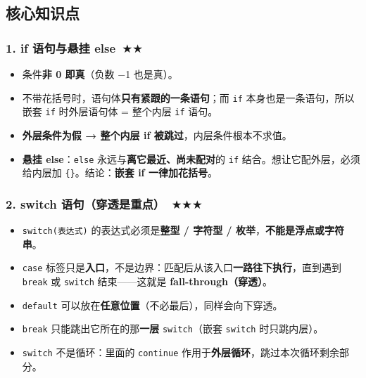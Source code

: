 \documentclass[UTF8,zihao=-4,a4paper]{ctexart}
\newcommand{\cstar}{\textcolor{deepred}{$\bigstar$}}
\begin{document}
\subsection{核心知识点}

\subsubsection*{1. if 语句与悬挂 else\ \cstar\cstar}
\begin{itemize}
  \item 条件\textbf{非 0 即真}（负数 −1 也是真）。
  \item 不带花括号时，语句体\textbf{只有紧跟的一条语句}；而 \texttt{if} 本身也是一条语句，所以嵌套 \texttt{if} 时外层语句体 = 整个内层 \texttt{if} 语句。
  \item \textbf{外层条件为假 → 整个内层 if 被跳过}，内层条件根本不求值。
  \item \textbf{悬挂 else}：\texttt{else} 永远与\textbf{离它最近、尚未配对}的 \texttt{if} 结合。想让它配外层，必须给内层加 \texttt{\{\}}。结论：\textbf{嵌套 if 一律加花括号}。
\end{itemize}

\subsubsection*{2. switch 语句（穿透是重点）\ \cstar\cstar\cstar}
\begin{itemize}
  \item \texttt{switch(表达式)} 的表达式必须是\textbf{整型 / 字符型 / 枚举}，\textbf{不能是浮点或字符串}。
  \item \texttt{case} 标签只是\textbf{入口}，不是边界：匹配后从该入口\textbf{一路往下执行}，直到遇到 \texttt{break} 或 \texttt{switch} 结束——这就是 \textbf{fall-through（穿透）}。
  \item \texttt{default} 可以放在\textbf{任意位置}（不必最后），同样会向下穿透。
  \item \texttt{break} 只能跳出它所在的那\textbf{一层} \texttt{switch}（嵌套 \texttt{switch} 时只跳内层）。
  \item \texttt{switch} 不是循环：里面的 \texttt{continue} 作用于\textbf{外层循环}，跳过本次循环剩余部分。
\end{itemize}
\end{document}
